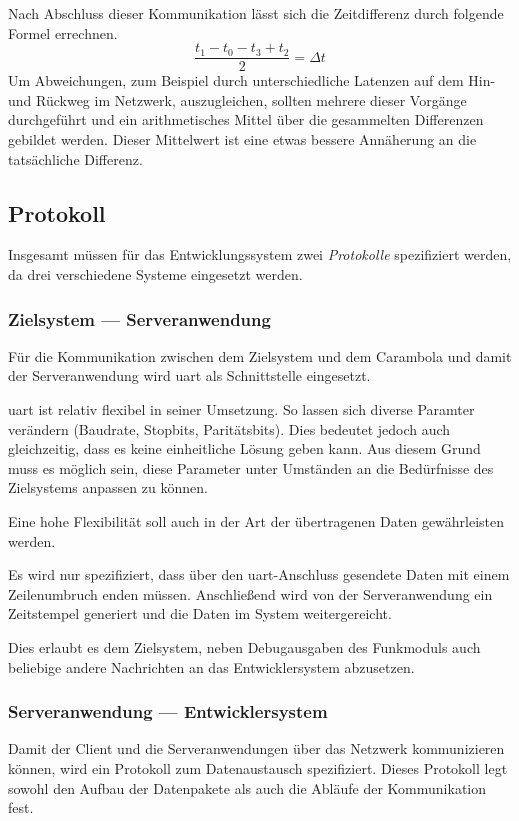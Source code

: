 Nach Abschluss dieser Kommunikation lässt sich die Zeitdifferenz durch folgende
Formel errechnen.
\begin{equation}
\frac{t_1-t_0-t_3+t_2}{2}=\Delta t
\end{equation}
Um Abweichungen, zum Beispiel durch unterschiedliche Latenzen auf dem Hin- und
Rückweg im Netzwerk, auszugleichen, sollten mehrere dieser Vorgänge durchgeführt
und ein arithmetisches Mittel über die gesammelten Differenzen gebildet werden.
Dieser Mittelwert ist eine etwas bessere Annäherung an die tatsächliche
Differenz.

\subsection{Protokoll}
Insgesamt müssen für das Entwicklungssystem zwei \emph{Protokolle} spezifiziert
werden, da drei verschiedene Systeme eingesetzt werden.

\subsubsection*{Zielsystem --- Serveranwendung}
Für die Kommunikation zwischen dem Zielsystem und dem Carambola und damit der
Serveranwendung wird \gls{uart} als Schnittstelle eingesetzt.

\gls{uart} ist relativ flexibel in seiner Umsetzung. So lassen sich
diverse Paramter verändern (Baudrate, Stopbits, Paritätsbits). Dies
bedeutet jedoch auch gleichzeitig, dass es keine einheitliche Lösung geben kann.
Aus diesem Grund muss es möglich sein, diese Parameter unter Umständen an die
Bedürfnisse des Zielsystems anpassen zu können.

Eine hohe Flexibilität soll auch in der Art der übertragenen Daten
gewährleisten werden.

Es wird nur spezifiziert, dass über den \gls{uart}-Anschluss
gesendete Daten mit einem Zeilenumbruch enden müssen. Anschließend wird von der
Serveranwendung ein Zeitstempel generiert und die Daten im System
weitergereicht.

Dies erlaubt es dem Zielsystem, neben Debugausgaben des Funkmoduls auch
beliebige andere Nachrichten an das Entwicklersystem abzusetzen.

\subsubsection*{Serveranwendung --- Entwicklersystem}
Damit der Client und die Serveranwendungen über das Netzwerk kommunizieren
können, wird ein Protokoll zum Datenaustausch spezifiziert. Dieses Protokoll
legt sowohl den Aufbau der Datenpakete als auch die Abläufe der Kommunikation
fest.

